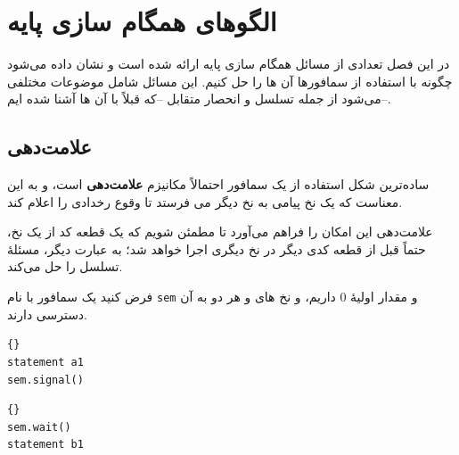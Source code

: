 \documentclass{book}
\newcommand{\clearemptydoublepage}{\newpage\cleardoublepage}
\begin{document}
\clearemptydoublepage

\chapter{الگوهای همگام سازی پایه}

در این فصل تعدادی از مسائل همگام سازی پایه ارائه شده است و نشان داده می‌شود چگونه با استفاده از سمافورها آن ها را حل کنیم. این مسائل شامل موضوعات مختلفی می‌شود از جمله تسلسل و انحصار متقابل --که قبلاً با آن ها آشنا شده ایم--.

\section{علامت‌دهی}

ساده‌ترین شکل استفاده از یک سمافور احتمالاً مکانیزم \textbf{علامت‌دهی}  است، 
و به این معناست که یک نخ%
پیامی به نخ دیگر می فرستد تا وقوع رخدادی را اعلام کند.

علامت‌دهی این امکان را فراهم می‌آورد تا مطمئن شویم که یک قطعه کد از یک نخ، حتماً قبل از قطعه کدی دیگر در نخ دیگری اجرا خواهد شد؛ به عبارت دیگر، مسئلهٔ تسلسل را حل می‌کند.

فرض کنید یک سمافور با نام \texttt{sem} و مقدار اولیهٔ  $0$ داریم، و نخ های  و  هر دو به آن دسترسی دارند.

\begin{latin}
\begin{minipage}[t]{2in}
\begin{lstlisting}[title={Thread A}]{}
statement a1
sem.signal()
\end{lstlisting}
\end{minipage}
\hfill
\begin{minipage}[t]{2in}
\begin{lstlisting}[title={Thread B}]{}
sem.wait()
statement b1
\end{lstlisting}
\end{minipage}
\end{latin}
\end{document}
